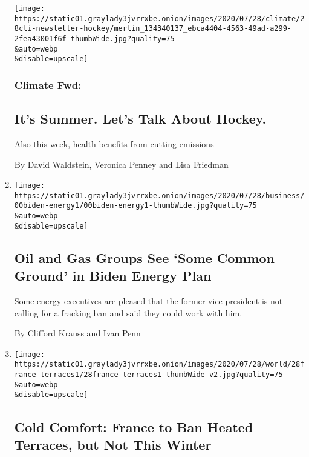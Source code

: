 \begin{enumerate}
  \texttt{[image: https://static01.graylady3jvrrxbe.onion/images/2020/07/28/climate/28cli-newsletter-hockey/merlin\_134340137\_ebca4404-4563-49ad-a299-2fea43001f6f-thumbWide.jpg?quality=75\\\&auto=webp\\\&disable=upscale]}

  \hypertarget{climate-fwd}{%
  \subsubsection{Climate Fwd:}\label{climate-fwd}}

  \hypertarget{its-summer-lets-talk-about-hockey}{%
  \subsection{It's Summer. Let's Talk About
  Hockey.}\label{its-summer-lets-talk-about-hockey}}

  Also this week, health benefits from cutting emissions

  By David Waldstein, Veronica Penney and Lisa Friedman
\item
  \href{/2020/07/28/business/energy-environment/joe-biden-oil-gas-energy.html}{}

  \texttt{[image: https://static01.graylady3jvrrxbe.onion/images/2020/07/28/business/00biden-energy1/00biden-energy1-thumbWide.jpg?quality=75\\\&auto=webp\\\&disable=upscale]}

  \hypertarget{oil-and-gas-groups-see-some-common-ground-in-biden-energy-plan}{%
  \subsection{Oil and Gas Groups See `Some Common Ground' in Biden
  Energy
  Plan}\label{oil-and-gas-groups-see-some-common-ground-in-biden-energy-plan}}

  Some energy executives are pleased that the former vice president is
  not calling for a fracking ban and said they could work with him.

  By Clifford Krauss and Ivan Penn
\item
  \href{/2020/07/28/world/europe/france-heated-terraces-coronavirus.html}{}

  \texttt{[image: https://static01.graylady3jvrrxbe.onion/images/2020/07/28/world/28france-terraces1/28france-terraces1-thumbWide-v2.jpg?quality=75\\\&auto=webp\\\&disable=upscale]}

  \hypertarget{cold-comfort-france-to-ban-heated-terraces-but-not-this-winter}{%
  \subsection{Cold Comfort: France to Ban Heated Terraces, but Not This
  Winter}\label{cold-comfort-france-to-ban-heated-terraces-but-not-this-winter}}


\end{enumerate}
